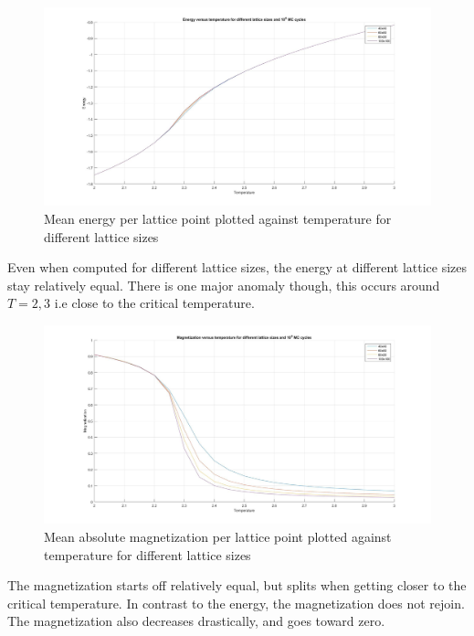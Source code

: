 \documentclass[10pt,a4paper]{article}
\begin{document}
\begin{figure} [H]
\centerline{
\includegraphics[scale=0.26]{energyVSt.jpg}
}
\caption{Mean energy per lattice point plotted against temperature for different lattice sizes}
\label{fig:EnergyVSt}
\end{figure}

\noindent Even when computed for different lattice sizes, the energy at different lattice sizes stay relatively equal. There is one major anomaly though, this occurs around $T=2,3$ i.e close to the critical temperature. 


\begin{figure} [H]
\centerline{
\includegraphics[scale=0.26]{magnetizationVSt.jpg}
}
\caption{Mean absolute magnetization per lattice point plotted against temperature for different lattice sizes}
\label{fig:MagnVSt}
\end{figure}

\noindent The magnetization starts off relatively equal, but splits when getting closer to the critical temperature. In contrast to the energy, the magnetization does not rejoin. The magnetization also decreases drastically, and goes toward zero. 
\end{document}
